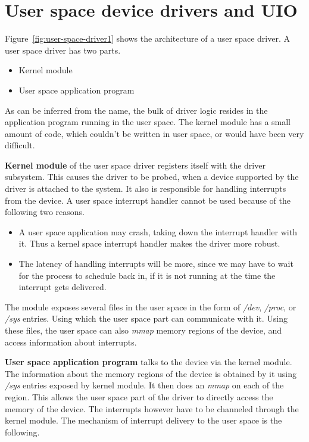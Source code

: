 \documentclass[twoside]{iitbreport}
\begin{document}
\chapter{User space device drivers and UIO\label{ch:usduio}}
Figure~\ref{fig:user-space-driver1} shows the architecture of a user space driver. A user space driver has two parts.
\begin{itemize}
\item Kernel module
\item User space application program
\end{itemize}

As can be inferred from the name, the bulk of driver logic resides in the application program running in the user space. The kernel module has a small amount of code, which couldn't be written in user space, or would have been very difficult.

\textbf{Kernel module} of the user space driver registers itself with the driver subsystem. This causes the driver to be probed, when a device supported by the driver is attached to the system. It also is responsible for handling interrupts from the device. A user space interrupt handler cannot be used because of the following two reasons. 

\begin{itemize}
\item A user space application may crash, taking down the interrupt handler with it. Thus a kernel space interrupt handler makes the driver more robust.
\item The latency of handling interrupts will be more, since we may have to wait for the process to schedule back in, if it is not running at the time the interrupt gets delivered.
\end{itemize}

The module exposes several files in the user space in the form of \textit{/dev}, \textit{/proc}, or \textit{/sys} entries. Using which the user space part can communicate with it. Using these files, the user space can also \textit{mmap} memory regions of the device, and access information about interrupts.

\textbf{User space application program} talks to the device via the kernel module. The information about the memory regions of the device is obtained by it using \textit{/sys} entries exposed by kernel module. It then does an \textit{mmap} on each of the region. This allows the user space part of the driver to directly access the memory of the device. The interrupts however have to be channeled through the kernel module. The mechanism of interrupt delivery to the user space is the following.
\end{document}
